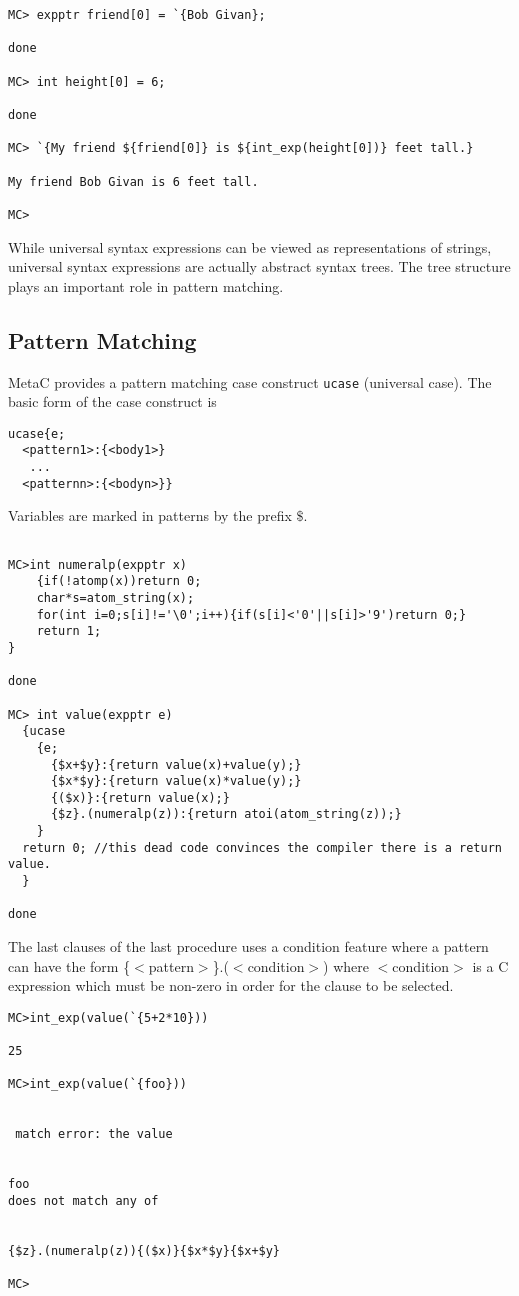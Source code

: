 \documentclass{article}
\begin{document}
\begin{verbatim}
MC> expptr friend[0] = `{Bob Givan};

done

MC> int height[0] = 6;

done

MC> `{My friend ${friend[0]} is ${int_exp(height[0])} feet tall.}

My friend Bob Givan is 6 feet tall.

MC> 
\end{verbatim}

While universal syntax expressions can be viewed as representations of strings, universal syntax
expressions are actually abstract syntax trees. The tree structure
plays an important role in pattern matching.

\subsection{Pattern Matching}

MetaC provides a pattern matching case construct {\tt ucase} (universal case).
The basic form of the case construct is

\begin{verbatim}
ucase{e;
  <pattern1>:{<body1>}
   ...
  <patternn>:{<bodyn>}}
\end{verbatim}

Variables are marked in patterns by the prefix $\$$.

\begin{verbatim}

MC>int numeralp(expptr x)
    {if(!atomp(x))return 0;
    char*s=atom_string(x);
    for(int i=0;s[i]!='\0';i++){if(s[i]<'0'||s[i]>'9')return 0;}
    return 1;
}

done

MC> int value(expptr e)
  {ucase
    {e;
      {$x+$y}:{return value(x)+value(y);}
      {$x*$y}:{return value(x)*value(y);}
      {($x)}:{return value(x);}
      {$z}.(numeralp(z)):{return atoi(atom_string(z));}
    }
  return 0; //this dead code convinces the compiler there is a return value.
  }

done
\end{verbatim}

The last clauses of the last procedure uses a condition feature where a pattern can have the
form \{$<$pattern$>$\}.($<$condition$>$)
where $<$condition$>$ is a C expression which must be non-zero in order for the clause to be selected.

\begin{verbatim}
MC>int_exp(value(`{5+2*10}))

25

MC>int_exp(value(`{foo}))


 match error: the value 


foo
does not match any of


{$z}.(numeralp(z)){($x)}{$x*$y}{$x+$y}

MC>
\end{verbatim}
\end{document}
